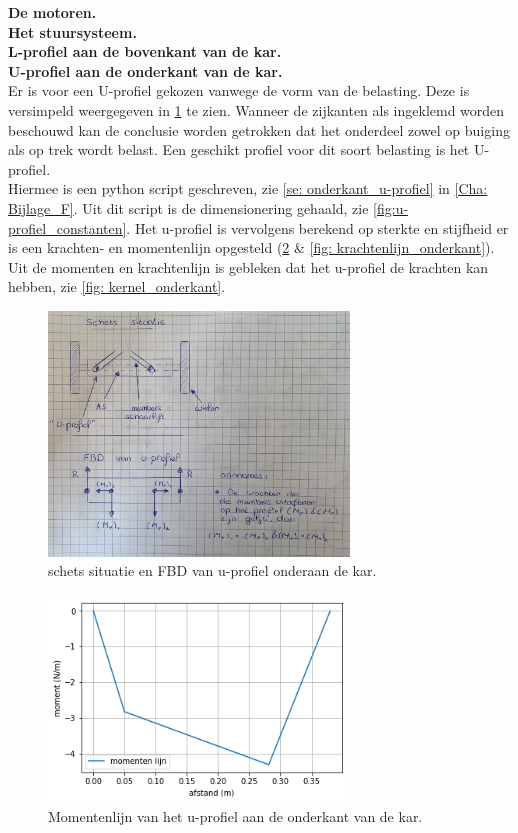 \textbf{De motoren.}\\

\textbf{Het stuursysteem.}\\

\textbf{L-profiel aan de bovenkant van de kar.}\\

\textbf{U-profiel aan de onderkant van de kar.}\\
Er is voor een U-profiel gekozen vanwege de vorm van de belasting. Deze is versimpeld weergegeven in \cref{fig: schets_FBD_uprofiel} te zien. Wanneer de zijkanten als ingeklemd worden beschouwd kan de conclusie worden getrokken dat het onderdeel zowel op buiging als op trek wordt belast. Een geschikt profiel voor dit soort belasting is het U-profiel.\\
Hiermee is een python script geschreven, zie \cref{se: onderkant_u-profiel} in \cref{Cha: Bijlage_F}. Uit dit script is de dimensionering gehaald, zie \cref{fig:u-profiel_constanten}. Het u-profiel is vervolgens berekend op sterkte en stijfheid er is een krachten- en momentenlijn opgesteld (\cref{fig: momentenlijn_onderkant} \& \cref{fig: krachtenlijn_onderkant}). Uit de momenten en krachtenlijn is gebleken dat het u-profiel de krachten kan hebben, zie \cref{fig: kernel_onderkant}.

\begin{figure}[H]
    \includegraphics[width = 80mm]{04_conceptdimensionering/U-profiel_tekening.jpg}
    \caption{schets situatie en FBD van u-profiel onderaan de kar.}
    \label{fig: schets_FBD_uprofiel}
\end{figure}
\vspace{\baselineskip}

\begin{figure}[H]
    \includegraphics[width = 80mm]{06_bijlage_F/onderkant_u_profiel/momentenlijn_onderkant.png}
    \caption{Momentenlijn van het u-profiel aan de onderkant van de kar.}
    \label{fig: momentenlijn_onderkant}
\end{figure}
\vspace{\baselineskip}


